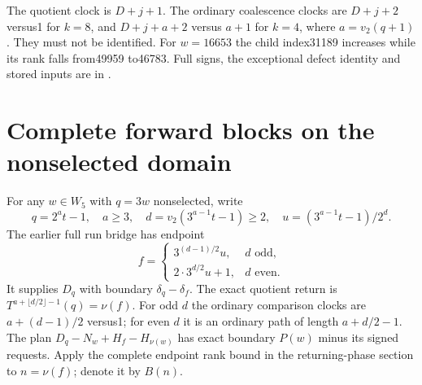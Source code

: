 \documentclass[11pt]{article}
\begin{document}
The quotient clock is $D+j+1$. The ordinary coalescence clocks are
$D+j+2$ versus1 for $k=8$, and $D+j+a+2$ versus $a+1$ for $k=4$,
where $a=v_2(q+1)$. They must not be identified. For $w=16653$ the
child index31189 increases while its rank falls from49959 to46783.
Full signs, the exceptional defect identity and stored inputs are in
.

\section{Complete forward blocks on the nonselected domain}
For any $w\in W_5$ with $q=3w$ nonselected, write
\[
 q=2^at-1,\quad a\ge3,\quad
 d=v_2(3^{a-1}t-1)\ge2,\quad u=(3^{a-1}t-1)/2^d.
\]
The earlier full run bridge has endpoint
\[
 f=\begin{cases}3^{(d-1)/2}u,&d\text{ odd},\\
 2\cdot3^{d/2}u+1,&d\text{ even}.\end{cases}
\]
It supplies $D_q$ with boundary $\delta_q-\delta_f$. The exact quotient
return is $T^{a+\lfloor d/2\rfloor-1}(q)=\nu(f)$. For odd $d$ the
ordinary comparison clocks are $a+(d-1)/2$ versus1; for even $d$ it
is an ordinary path of length $a+d/2-1$.
The plan $D_q-N_w+H_f-H_{\nu(w)}$ has exact boundary $P(w)$ minus
its signed requests. Apply the complete endpoint rank bound in the
returning-phase section to $n=\nu(f)$; denote it by $B(n)$.
\end{document}
